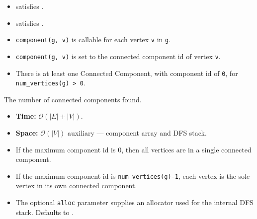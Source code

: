 {
\small
     
}

\begin{itemdescr}
      \pnum\mandates
            \begin{itemize}
                  \item {} satisfies .
                  \item {} satisfies .
            \end{itemize}
      \pnum\preconditions
            \begin{itemize}
                  \item
                        \lstinline{component(g, v)} is callable for each vertex \lstinline{v} in \lstinline{g}.
            \end{itemize}
      \pnum\effects
            \begin{itemize}
                  \item
                        \lstinline{component(g, v)} is set to the connected component id of vertex \lstinline{v}.
                  \item
                        There is at least one Connected Component, with component id of \lstinline{0}, for \lstinline{num_vertices(g) > 0}.
            \end{itemize}
      \pnum\returns The number of connected components found.
      \pnum\complexity
            \begin{itemize}
                  \item \textbf{Time:} $\mathcal{O}(|E|+|V|)$.
                  \item \textbf{Space:} $\mathcal{O}(|V|)$ auxiliary --- component array and DFS stack.
            \end{itemize}
      \pnum\remarks 
            \begin{itemize}
                  \item
                        If the maximum component id is 0, then all vertices are in a single connected component.
                  \item
                        If the maximum component id is \lstinline{num_vertices(g)-1}, each vertex is the sole vertex in its 
                        own connected component.
                  \item The optional \lstinline{alloc} parameter supplies an allocator used for
                        the internal DFS stack.  Defaults to .
            \end{itemize}
\end{itemdescr}

